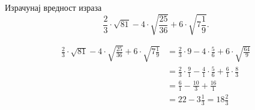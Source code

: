 \documentclass[12pt,a5paper,addpoints]{exam}
\def\grupa#1#2#3#4{#1}
\begin{document}
\begin{questions}
\question[4] %
 Израчунај вредност израза
 $$
  \grupa{
   \frac 23 ⋅ \sqrt{81} - 4 ⋅ \sqrt{\frac{25}{36}} + 6 ⋅ \sqrt{7 \frac 19}
  }{
   \frac 45 ⋅ \sqrt{1 \frac 9{16}} - 3 ⋅ \sqrt{\frac 49} + \frac 23 ⋅ \sqrt{2 \frac 14}
  }{
   \frac 34 ⋅ \sqrt{1 \frac 79} - \frac 12 ⋅ \sqrt{64} + 2 ⋅ \sqrt{0,\!04}
  }{
   \frac 34 ⋅ \sqrt{16} + 9 ⋅ \sqrt{\frac 49} - 6 ⋅ \sqrt{2 \frac 14}
  }.
 $$
 \begin{solution}
 \begin{align*}
  \grupa{
   \frac 23 ⋅ \sqrt{81} - 4 ⋅ \sqrt{\frac{25}{36}} + 6 ⋅ \sqrt{7 \frac 19}
  }{
   \frac 45 ⋅ \sqrt{1 \frac 9{16}} - 3 ⋅ \sqrt{\frac 49} + \frac 23 ⋅ \sqrt{2 \frac 14}
  }{
   \frac 34 ⋅ \sqrt{1 \frac 79} - \frac 12 ⋅ \sqrt{64} + 2 ⋅ \sqrt{0,\!04}
  }{
   \frac 34 ⋅ \sqrt{16} + 9 ⋅ \sqrt{\frac 49} - 6 ⋅ \sqrt{2 \frac 14}
  }
  &= \grupa{
   \frac 23 ⋅ 9 - 4 ⋅ \frac 56 + 6 ⋅ \sqrt{\frac{64}9}
  }{
   \frac 45 ⋅ \sqrt{\frac{25}{16}} - 3 ⋅ \frac 23 + \frac 23 ⋅ \sqrt{\frac 94}
  }{
   \frac 34 ⋅ \sqrt{\frac{16}9} - \frac 12 ⋅ 8 + 2 ⋅ 0,\!2
  }{
   \frac 34 ⋅ 4 + 9 ⋅ \frac 23 - 6 ⋅ \sqrt{\frac 94}
  }
  \\ &= \grupa{
   \frac 23 ⋅ \frac 91 - \frac 41 ⋅ \frac 56 + \frac 61 ⋅ \frac 83
  }{
   \frac 45 ⋅ \frac 54 - \frac 31 ⋅ \frac 23 + \frac 23 ⋅ \frac 32
  }{
   \frac 34 ⋅ \frac 43 - \frac 12 ⋅ \frac 81 + 0,\!4
  }{
   \frac 34 ⋅ \frac 41 + \frac 91 ⋅ \frac 23 - \frac 61 ⋅ \frac 32
  }
  \\ &= \grupa{
   \frac 61 - \frac{10}3 + \frac{16}1
  }{
   \frac 11 - \frac 21 + \frac 11
  }{
   \frac 11 - \frac 41 + 0,\!4
  }{
   \frac 31 + \frac 61 - \frac 91
  }
  \\ &= \grupa{22 - 3\frac 13}{-1+1}{-3 + 0,\!4}{9-9}
  = \grupa{18 \frac 23}{0}{-2,\!6}{0}
 \end{align*}
 \end{solution}


\end{questions}
\end{document}
